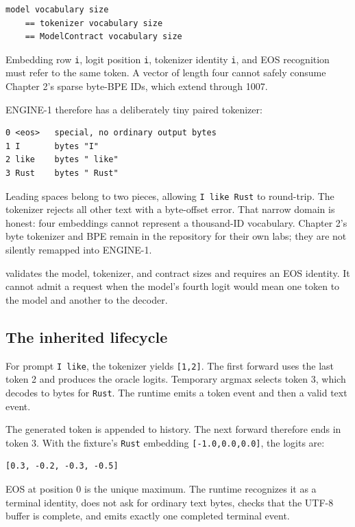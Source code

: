 \begin{verbatim}
model vocabulary size
    == tokenizer vocabulary size
    == ModelContract vocabulary size
\end{verbatim}

Embedding row \texttt{i}, logit position \texttt{i}, tokenizer identity
\texttt{i}, and EOS recognition must refer to the same token. A vector
of length four cannot safely consume Chapter 2's sparse byte-BPE IDs,
which extend through 1007.

ENGINE-1 therefore has a deliberately tiny paired tokenizer:

\begin{verbatim}
0 <eos>   special, no ordinary output bytes
1 I       bytes "I"
2 like    bytes " like"
3 Rust    bytes " Rust"
\end{verbatim}

Leading spaces belong to two pieces, allowing \texttt{I\ like\ Rust} to
round-trip. The tokenizer rejects all other text with a byte-offset
error. That narrow domain is honest: four embeddings cannot represent a
thousand-ID vocabulary. Chapter 2's byte tokenizer and BPE remain in the
repository for their own labs; they are not silently remapped into
ENGINE-1.

\texttt{} validates the model, tokenizer,
and contract sizes and requires an EOS identity. It cannot admit a
request when the model's fourth logit would mean one token to the model
and another to the decoder.

\subsection{The inherited lifecycle}\label{the-inherited-lifecycle}

For prompt \texttt{I\ like}, the tokenizer yields \texttt{{[}1,2{]}}.
The first forward uses the last token 2 and produces the oracle logits.
Temporary argmax selects token 3, which decodes to bytes for
\texttt{Rust}. The runtime emits a token event and then a valid text
event.

The generated token is appended to history. The next forward therefore
ends in token 3. With the fixture's \texttt{Rust} embedding
\texttt{{[}-1.0,0.0,0.0{]}}, the logits are:

\begin{verbatim}
[0.3, -0.2, -0.3, -0.5]
\end{verbatim}

EOS at position 0 is the unique maximum. The runtime recognizes it as a
terminal identity, does not ask for ordinary text bytes, checks that the
UTF-8 buffer is complete, and emits exactly one completed terminal
event.

